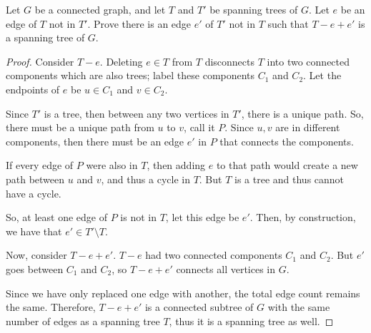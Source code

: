\documentclass[../hw5]{subfiles}
\begin{document}
\begin{problem}
Let $G$ be a connected graph, and let $T$ and $T'$ be spanning trees of $G$. Let $e$ be an edge of $T$ not in $T'$. Prove there is an edge $e'$ of $T'$ not in $T$ such that $T - e + e'$ is a spanning tree of $G$.
\end{problem}
\begin{proof}
	Consider $T-e$.
	Deleting  $e\in T$ from $T$ disconnects  $T$ into two connected components which are also trees;
	label these components $C_1$ and $C_2$.
	Let the endpoints of $e$ be  $u\in C_1$ and  $v\in C_2$.

	Since $T'$ is a tree, then between any two vertices in  $T'$, there is a unique path.
	So, there must be a unique path from  $u$ to  $v$, call it $P$.
	Since  $u,v$ are in different components, then there must be an edge $e'$ in  $P$ that connects the components.

	If every edge of  $P$ were also in  $T$, then adding $e$ to that path would create a new path between  $u$ and  $v$, and thus a cycle in  $T$.
	But  $T$ is a tree and thus cannot have a cycle.

	So, at least one edge of  $P$ is not in  $T$, let this edge be  $e'$.
	Then, by construction, we have that $e'\in T'\setminus T$.

	Now, consider $T-e + e'$.
	$T-e$ had two connected components  $C_1$ and $C_2$.
	But $e'$ goes between  $C_1$ and $C_2$, so $T-e+e'$ connects all vertices in  $G$.

	Since we have only replaced one edge with another, the total edge count remains the same.
	Therefore,  $T-e+e'$ is a connected subtree of  $G$ with the same number  of edges as a spanning tree $T$, thus it is a spanning tree as well.
\end{proof}
\end{document}
